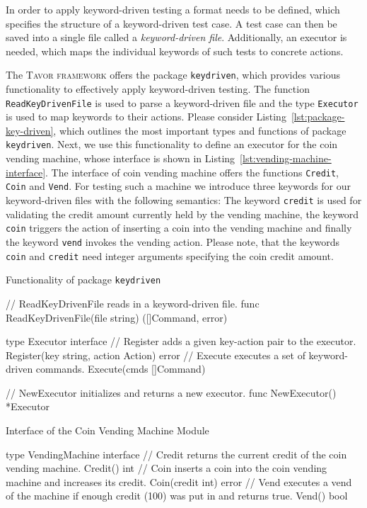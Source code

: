 In order to apply keyword-driven testing a format needs to be defined, which specifies the structure of a keyword-driven test case. A test case can then be saved into a single file called a \emph{keyword-driven file}. Additionally, an executor is needed, which maps the individual keywords of such tests to concrete actions.

The \textsc{Tavor framework} offers the package \texttt{keydriven}, which provides various functionality to effectively apply keyword-driven testing. The function \texttt{ReadKeyDrivenFile} is used to parse a keyword-driven file and the type \texttt{Executor} is used to map keywords to their actions. Please consider Listing~\ref{lst:package-key-driven}, which outlines the most important types and functions of package \texttt{keydriven}. Next, we use this functionality to define an executor for the coin vending machine, whose interface is shown in Listing~\ref{lst:vending-machine-interface}. The interface of coin vending machine offers the functions \texttt{Credit}, \texttt{Coin} and \texttt{Vend}. For testing such a machine we introduce three keywords for our keyword-driven files with the following semantics: The keyword \texttt{credit} is used for validating the credit amount currently held by the vending machine, the keyword \texttt{coin} triggers the action of inserting a coin into the vending machine and finally the keyword \texttt{vend} invokes the vending action. Please note, that the keywords \texttt{coin} and \texttt{credit} need integer arguments specifying the coin credit amount.

\begin{listing}
\caption{Functionality of package \texttt{keydriven}}
\label{lst:package-key-driven}
\begin{gocode}
// ReadKeyDrivenFile reads in a keyword-driven file.
func ReadKeyDrivenFile(file string) ([]Command, error)

type Executor interface {
    // Register adds a given key-action pair to the executor.
    Register(key string, action Action) error
    // Execute executes a set of keyword-driven commands.
    Execute(cmds []Command)
}

// NewExecutor initializes and returns a new executor.
func NewExecutor() *Executor
\end{gocode}
\end{listing}

\begin{listing}
\caption{Interface of the Coin Vending Machine Module}
\label{lst:vending-machine-interface}
\begin{gocode}
type VendingMachine interface {
    // Credit returns the current credit of the coin vending machine.
    Credit() int
    // Coin inserts a coin into the coin vending machine and increases its credit.
    Coin(credit int) error
    // Vend executes a vend of the machine if enough credit (100) was put in and returns true.
    Vend() bool
}
\end{gocode}
\end{listing}

